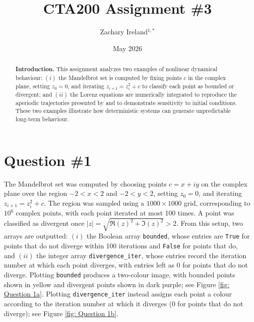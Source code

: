 \documentclass[aps,twocolumn,longbibliography,nofootinbib]{revtex4-2}
\begin{document}
\title{CTA200 Assignment \#3}

\author{Zachary Ireland$^{1,\ast}$}


\date{May 2026}

\begin{abstract}
\textbf{Introduction.} This assignment analyzes two examples of nonlinear dynamical behaviour: $(i)$ the Mandelbrot set is computed by fixing points $c$ in the complex plane, setting $z_0=0$, and iterating $z_{i+1}=z_i^2+c$ to classify each point as bounded or divergent; and $(ii)$ the Lorenz equations are numerically integrated to reproduce the aperiodic trajectories presented by \citet{Lorenz1963} and to demonstrate sensitivity to initial conditions. These two examples illustrate how deterministic systems can generate unpredictable long-term behaviour.
\end{abstract}

\maketitle

\section{Question \#1}
The Mandelbrot set was computed by choosing points $c=x+iy$ on the complex plane over the region $-2<x<2$ and $-2<y<2$, setting $z_0=0$, and iterating $z_{i+1}=z_i^2+c$. The region was sampled using a $1000\!\times\!1000$ grid, corresponding to $10^6$ complex points, with each point iterated at most 100 times. A point was classified as divergent once $|z| = \sqrt{\Re(z)^2 + \Im(z)^2}>2$. From this setup, two arrays are outputted: $(i)$ the Boolean array \texttt{bounded}, whose entries are \texttt{True} for points that do not diverge within 100 iterations and \texttt{False} for points that do, and $(ii)$ the integer array \texttt{divergence\_iter}, whose entries record the iteration number at which each point diverges, with entries left as 0 for points that do not diverge. Plotting \texttt{bounded} produces a two-colour image, with bounded points shown in yellow and divergent points shown in dark purple; see Figure \ref{fig: Question 1a}. Plotting \texttt{divergence\_iter} instead assigns each point a colour according to the iteration number at which it diverges (0 for points that do not diverge); see Figure \ref{fig: Question 1b}.
\end{document}
